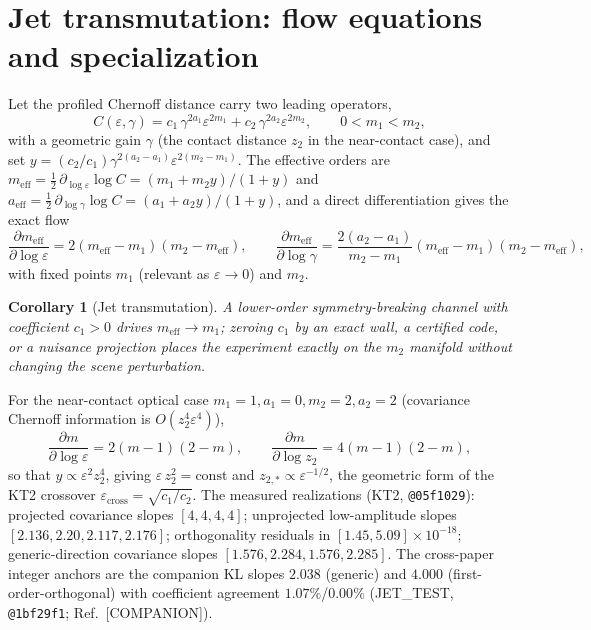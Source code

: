 \documentclass[10pt,onecolumn]{article}
\theoremstyle{plain}
\newtheorem{corollary}{Corollary}
\theoremstyle{definition}
\newcommand{\eps}{\varepsilon}
\begin{document}
\section{Jet transmutation: flow equations and specialization}\label{sec:s3}
Let the profiled Chernoff distance carry two leading operators,
\begin{equation}
C(\eps,\gamma)=c_1\,\gamma^{2a_1}\eps^{2m_1}+c_2\,\gamma^{2a_2}\eps^{2m_2},\qquad
0<m_1<m_2,
\label{eq:s-two}
\end{equation}
with a geometric gain $\gamma$ (the contact distance $z_2$ in the near-contact
case), and set $y=(c_2/c_1)\gamma^{2(a_2-a_1)}\eps^{2(m_2-m_1)}$. The effective
orders are $m_{\mathrm{eff}}=\tfrac12\,\partial_{\log\eps}\log C=(m_1+m_2y)/(1+y)$ and
$a_{\mathrm{eff}}=\tfrac12\,\partial_{\log\gamma}\log C=(a_1+a_2y)/(1+y)$, and a
direct differentiation gives the exact flow
\begin{equation}
\frac{\partial m_{\mathrm{eff}}}{\partial\log\eps}=2(m_{\mathrm{eff}}-m_1)
(m_2-m_{\mathrm{eff}}),\qquad
\frac{\partial m_{\mathrm{eff}}}{\partial\log\gamma}=\frac{2(a_2-a_1)}{m_2-m_1}
(m_{\mathrm{eff}}-m_1)(m_2-m_{\mathrm{eff}}),
\label{eq:s-flow}
\end{equation}
with fixed points $m_1$ (relevant as $\eps\to0$) and $m_2$.

\begin{corollary}[Jet transmutation]\label{cor:s-jet}
A lower-order symmetry-breaking channel with coefficient $c_1>0$ drives
$m_{\mathrm{eff}}\to m_1$; zeroing $c_1$ by an exact wall, a certified code, or a
nuisance projection places the experiment exactly on the $m_2$ manifold without
changing the scene perturbation.
\end{corollary}

For the near-contact optical case $m_1=1,a_1=0,m_2=2,a_2=2$ (covariance Chernoff
information is $O(z_2^4\eps^4)$),
\begin{equation}
\frac{\partial m}{\partial\log\eps}=2(m-1)(2-m),\qquad
\frac{\partial m}{\partial\log z_2}=4(m-1)(2-m),
\label{eq:s-r44}
\end{equation}
so that $y\propto\eps^2 z_2^4$, giving $\eps\,z_2^2=\text{const}$ and
$z_{2,\ast}\propto\eps^{-1/2}$, the geometric form
of the KT2 crossover $\eps_{\mathrm{cross}}=\sqrt{c_1/c_2}$. The measured realizations
(KT2, \texttt{@05f1029}): projected covariance slopes $[4,4,4,4]$; unprojected
low-amplitude slopes $[2.136,2.20,2.117,2.176]$; orthogonality residuals in
$[1.45,5.09]\times10^{-18}$; generic-direction covariance slopes
$[1.576,2.284,1.576,2.285]$. The cross-paper integer anchors are the companion KL
slopes $2.038$ (generic) and $4.000$ (first-order-orthogonal) with coefficient
agreement $1.07\%$/$0.00\%$ (JET\_TEST, \texttt{@1bf29f1}; Ref.~[COMPANION]).
\end{document}
